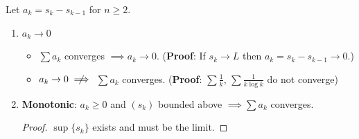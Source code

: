 \begin{theorem*}\hspace{0pt}
  Let $a_k = s_k - s_{k-1}$ for $n \geq 2$.
  \begin{enumerate}[label=(\roman*)]
  \item $a_k \to 0$
    \begin{itemize}
    \item $\sum a_k$ converges $\implies a_k \to 0$. ({\bf Proof}: If $s_k \to L$ then $a_k = s_k - s_{k-1} \to 0$.)
    \item $a_k \to 0 \nimplies$ $\sum a_k$ converges. ({\bf Proof}: $\sum \frac{1}{k}$, $\sum \frac{1}{k\log k}$
      do not converge)
    \end{itemize}
  \item {\bf Monotonic}: $a_k \geq 0$ and $(s_k)$ bounded above $\implies \sum a_k$ converges.
    \begin{proof}
      $\sup \{s_k\}$ exists and must be the limit.
    \end{proof}





\end{enumerate}
\end{theorem*}
